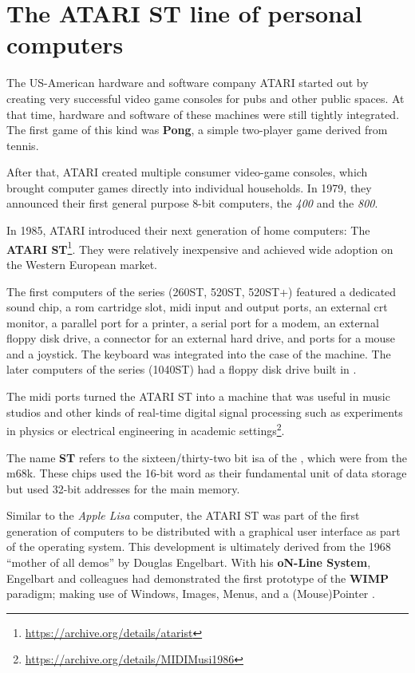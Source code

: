 \section{The ATARI ST line of personal computers}
\label{sec:atarist}

The US-American hardware and software company \gls{ATARI} started out by creating very successful video game consoles for pubs and other public spaces. At that time, hardware and software of these machines were still tightly integrated. The first game of this kind was \textbf{Pong}, a simple two-player game derived from tennis.

After that, ATARI created multiple consumer video-game consoles, which brought computer games directly into individual households. In 1979, they announced their first general purpose 8-bit computers, the \textit{400} and the \textit{800}.

In 1985, ATARI introduced their next generation of home computers: The \textbf{ATARI ST}\footnote{\url{https://archive.org/details/atarist}}. They were relatively inexpensive and achieved wide adoption on the Western European market.

The first computers of the series (260ST, 520ST, 520ST+) featured a dedicated sound chip, a \acrshort{rom} cartridge slot, \acrshort{midi} input and output ports, an external \acrshort{crt} monitor, a parallel port for a printer, a serial port for a modem, an external floppy disk drive, a connector for an external hard drive, and ports for a mouse and a joystick. The keyboard was integrated into the case of the machine. The later computers of the series (1040ST) had a floppy disk drive built in \cite{vogt2021History}.

The \acrfull{midi} ports turned the ATARI ST into a machine that was useful in music studios and other kinds of real-time digital signal processing such as experiments in physics or electrical engineering in academic settings\footnote{\url{https://archive.org/details/MIDIMusi1986}}.

The name \textbf{ST} refers to the sixteen/thirty-two \gls{bit} \acrfull{isa} of the , which were from the \acrfull{m68k}. These chips used the 16-bit \gls{word} as their fundamental unit of data storage but used 32-bit addresses for the main memory.

Similar to the \textit{Apple Lisa} computer, the ATARI ST was part of the first generation of computers to be distributed with a graphical user interface as part of the operating system. This development is ultimately derived from the 1968 ``mother of all demos'' by Douglas Engelbart. With his \textbf{oN-Line System}, Engelbart and colleagues had demonstrated the first prototype of the \textbf{WIMP} paradigm; making use of Windows, Images, Menus, and a (Mouse)Pointer \cite{english1967display}.

